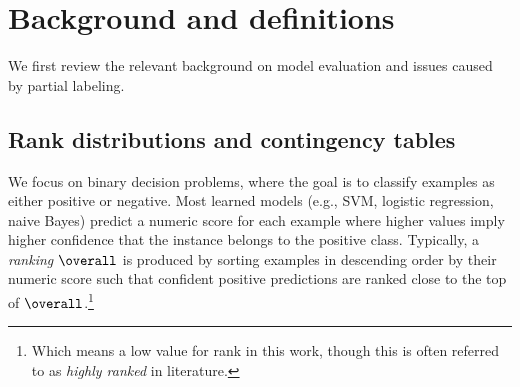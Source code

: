 \section{Background and definitions}
We first review the relevant background on model evaluation and issues caused by partial labeling. 



\subsection{Rank distributions and contingency tables} \label{contingency-intro}

We focus on binary decision problems, where the goal is to classify examples as either positive or negative. Most learned models (e.g., SVM, logistic regression, naive Bayes) predict a numeric score for each example where higher values imply higher confidence that the instance belongs to the positive class. Typically, a \emph{ranking} $\overall$ is produced by sorting examples in descending order by their numeric score such that confident positive predictions are ranked close to the top of $\overall$.\footnote{Which means a low value for rank in this work, though this is often referred to as \emph{highly ranked} in literature.}  






